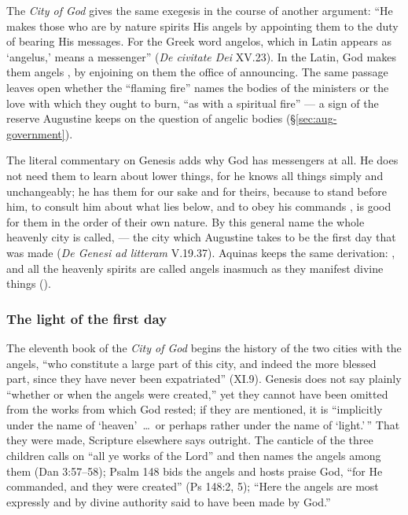 The \emph{City of God} gives the same exegesis in the course of another
argument: ``He makes those who are by nature spirits His angels by
appointing them to the duty of bearing His messages. For the Greek word
angelos, which in Latin appears as `angelus,' means a messenger''
(\emph{De civitate Dei} XV.23). In the Latin, God makes them angels
, by enjoining on them the office
of announcing. The same passage leaves open whether the ``flaming fire''
names the bodies of the ministers or the love with which they ought to
burn, ``as with a spiritual fire'' --- a sign of the reserve
Augustine keeps on the question of angelic bodies (\S\ref{sec:aug-government}).

The literal commentary on Genesis adds why God has messengers at all. He
does not need them to learn about lower things, for he knows all things
simply and unchangeably; he has them for our sake and for theirs, because
to stand before him, to consult him about what lies below, and to obey his
commands , is good for them in the order of their own nature. By this
general name the whole heavenly city is called,  --- the city which Augustine takes to be the first day that
was made (\emph{De Genesi ad litteram} V.19.37). Aquinas keeps the same
derivation: , and all the heavenly spirits
are called angels inasmuch as they manifest divine things ().

\subsubsection{The light of the first day}\label{sec:aug-creation}

The eleventh book of the \emph{City of God} begins the history of the two
cities with the angels, ``who constitute a large part of this city, and
indeed the more blessed part, since they have never been expatriated''
(XI.9). Genesis does not say plainly ``whether or when the angels were
created,'' yet they cannot have been omitted from the works from which God
rested; if they are mentioned, it is ``implicitly under the name of
`heaven'~\dots\ or perhaps rather under the name of `light.'\,'' That they
were made, Scripture elsewhere says outright. The
canticle of the three children calls on ``all ye works of the Lord'' and
then names the angels among them (Dan 3:57--58); Psalm 148 bids the
angels and hosts praise God, ``for He commanded, and they were created''
(Ps 148:2, 5); ``Here the angels are most expressly and by divine
authority said to have been made by God.''

